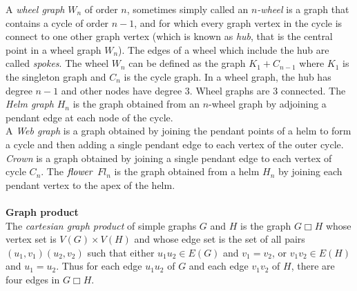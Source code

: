 \documentclass[12pt]{report}
\begin{document}
A {\em wheel graph} $W_n$ of order $n$, sometimes simply called an
{\em $n$-wheel} is a graph that contains a cycle of order $n-1$, and
for which every graph vertex in the cycle is connect to one other
graph vertex (which is known as {\em hub}, that is the central point
in a wheel graph $W_n$). The edges of a wheel which include the hub
are called {\em spokes}. The wheel $W_n$ can be defined as the graph
$K_1+C_{n-1}$ where $K_1$ is the singleton graph and $C_n$ is the
cycle graph. In a wheel graph, the hub has degree $n-1$ and other
nodes have degree $3$. Wheel graphs are $3$ connected.
The {\em Helm graph} $H_n$ is the graph obtained from an $n$-wheel graph by adjoining a pendant edge at each node of the cycle.\\
A {\em Web graph} is a graph obtained by joining the pendant points
of a helm to form a cycle and then adding a single pendant edge to
each vertex of the outer cycle. {\em Crown} is a graph obtained by
joining a single pendant edge to each
vertex  of cycle $C_n$. The $\it{flower}$ $Fl_n$ is the graph obtained from a helm $H_n$ by joining each pendant vertex to the apex of the helm.\\ \ \\
{\bf Graph product}\\
The {\em cartesian graph product} of  simple graphs $G$ and $H$ is the graph  $G\Box H$ whose vertex set is $V(G)\times V(H)$ and whose edge set is the set of all pairs $(u_1,v_1)(u_2,v_2)$ such that either $u_1u_2\in E(G)$ and $v_1=v_2$, or $v_1v_2\in E(H)$ and $u_1=u_2$. Thus for each edge $u_1u_2$ of $G$ and each edge $v_1v_2$ of $H$, there are four edges in $G\Box H$.\\%
\end{document}
